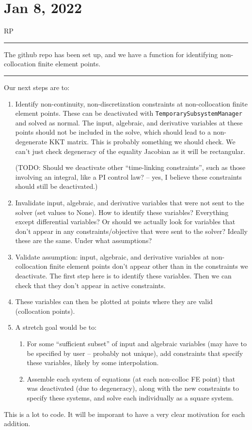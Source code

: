 \documentclass{article}
\newcommand{\RP}{RP\vspace{0.1cm}\hrule\vspace{0.2cm}}
\begin{document}
\section{Jan 8, 2022}
\RP
The github repo has been set up, and we have a function for identifying
non-collocation finite element points.

\vspace{0.5cm}\hrule\vspace{0.5cm}

Our next steps are to:
\begin{enumerate}
  \item Identify non-continuity, non-discretization constraints at
    non-collocation finite element points.
    These can be deactivated with \texttt{TemporarySubsystemManager}
    and solved as normal. The input, algebraic, and derivative variables
    at these points should not be included in the solve, which should
    lead to a non-degenerate KKT matrix.
    This is probably something we should check. We can't just check degeneracy
    of the equality Jacobian as it will be rectangular.

    (TODO: Should we deactivate other ``time-linking constraints'', such as
    those involving an integral, like a PI control law? -- yes, I believe
    these constraints should still be deactivated.)
  \item Invalidate input, algebraic, and derivative variables that were
    not sent to the solver (set values to None). How to identify these
    variables? Everything except differential variables? Or should we
    actually look for variables that don't appear in any constraints/objective
    that were sent to the solver? Ideally these are the same. Under what
    assumptions?
  \item Validate assumption: input, algebraic, and derivative variables
    at non-collocation finite element points don't appear other than in the
    constraints we deactivate. The first step here is to identify these
    variables. Then we can check that they don't appear in active constraints.
  \item These variables can then be plotted at points where they are
    valid (collocation points).
  \item A stretch goal would be to:
    \begin{enumerate}
      \item For some ``sufficient subset'' of input and algebraic variables
	(may have to be specified by user -- probably not unique),
	add constraints that specify these variables, likely by some
	interpolation.
      \item Assemble each system of equations (at each non-colloc FE point)
	that was deactivated (due to degeneracy), along with the new constraints
	to specify these systems, and solve each individually as a square
	system.
    \end{enumerate}
\end{enumerate}
This is a lot to code. It will be imporant to have a very clear motivation
for each addition.
\end{document}
